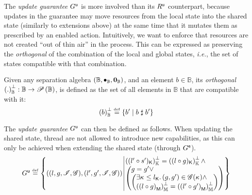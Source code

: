 The \emph{update guarantee} $G^{\textsf{u}}$ is more involved than its $R^{\textsf{u}}$ counterpart, because updates in the guarantee may move resources from the local state into the shared state (similarly to extensions above) at the same time that it mutates them as prescribed by an enabled action. Intuitively, we want to enforce that resources
are not created ``out of thin air'' in the process. This can be expressed as preserving the \emph{orthogonal} of the combination of the local and global states, \textit{i.e.}, the set of states compatible with that combination.
%
\begin{definition}[Orthogonal]\label{def:orthogonal}
Given any separation algebra $(\mathbb{B}, \bullet_{\mathbb{B}}, \mathbf{0}_{\mathbb{B}})$, and an element $b \in \mathbb{B}$, its \emph{orthogonal} $\left( .\right)_{\mathbb{B}}^{\bot} : \mathbb{B} \rightarrow \mathscr{P}\left(\mathbb{B} \right)$, is defined as the set of all elements in $\mathbb{B}$ that are compatible with it:
%
\[
	\left( b\right)_{\mathbb{B}}^{\bot} \mathrel{\stackrel{\smash{\scriptscriptstyle{\mathrm{def}}}}{=}} \left\{ b' \mid b \mathrel{\sharp} b' \right\}
\]
\end{definition}
%
The \emph{update guarantee} $G^{\textsf{u}}$ can then be defined as follows. When updating the shared state, thread are not allowed to introduce new capabilities, as this can only be achieved when extending the shared state (through $G^{\textsf{e}}$).
%
\[
	\updateG \eqdef
 	\left\{
	\begin{array}{@{} l @{\hspace*{2pt}} | @{\hspace*{2pt}} r @{}}
	  \left(
	     	(l, g, \lmod, \gmod),
	     	(l', g', \lmod, \gmod)
		\right)
  	&
  	\begin{array}{@{} l @{} }
  		\ortCap{\capPart{(l' \composeL s')}}  = \ortCap{\capPart{(l \composeL g)}} \land\\
	  	\left(
	  	\begin{array}{@{} l @{} }
	 		g = g' \lor\\
	 	  	\left(
	 	  	\begin{array}{@{} l @{}}
	 	  		\exsts{\ca{} \leq \capPart{l}}
	 	  		(g, g') \in \gmod(\ca{}) \land\\
	 	  	
	 	  	\ortH{\heapPart{\left(l \composeL g\right)}} = 
	 	  	\ortH{\heapPart{\left(l' \composeL g'\right)}}
	 	  	\end{array}	
	 	  	\right)
	 	\end{array}
   		\right)
   		\end{array}
 	\end{array}
	\right\}
\]
